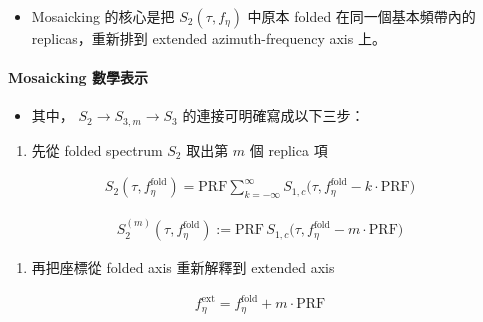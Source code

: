 \documentclass[10pt]{article}
\providecommand{\tightlist}{%
  \setlength{\itemsep}{0pt}\setlength{\parskip}{0pt}}
\begin{document}
\begin{itemize}
\tightlist
\item
  Mosaicking 的核心是把 \(S_2(\tau,f_\eta)\) 中原本 folded
  在同一個基本頻帶內的 replicas，重新排到 extended azimuth-frequency
  axis 上。
\end{itemize}

\hypertarget{mosaicking-ux6578ux5b78ux8868ux793a}{%
\paragraph{Mosaicking
數學表示}\label{mosaicking-ux6578ux5b78ux8868ux793a}}

\begin{itemize}
\tightlist
\item
  其中， \(S_2 \rightarrow S_{3,m} \rightarrow S_3\)
  的連接可明確寫成以下三步：
\end{itemize}

\begin{enumerate}
\def\labelenumi{\arabic{enumi})}
\tightlist
\item
  先從 folded spectrum \(S_2\) 取出第 \(m\) 個 replica 項
\end{enumerate}

\begin{equation}
\begin{aligned}
S_2(\tau,f_\eta^{\mathrm{fold}})
= \mathrm{PRF}\sum_{k=-\infty}^{\infty}S_{1,c}\biggl(\tau,f_\eta^{\mathrm{fold}}-k\cdot\mathrm{PRF}\biggr)
\end{aligned}
\end{equation}

\begin{equation}
\begin{aligned}
S_2^{(m)}(\tau,f_\eta^{\mathrm{fold}})
:= \mathrm{PRF}\,S_{1,c}\biggl(\tau,f_\eta^{\mathrm{fold}}-m\cdot\mathrm{PRF}\biggr)
\end{aligned}
\end{equation}

\begin{enumerate}
\def\labelenumi{\arabic{enumi})}
\setcounter{enumi}{1}
\tightlist
\item
  再把座標從 folded axis 重新解釋到 extended axis
\end{enumerate}

\begin{equation}
\begin{aligned}
f_\eta^{\mathrm{ext}}=f_\eta^{\mathrm{fold}}+m\cdot\mathrm{PRF}
\end{aligned}
\end{equation}
\end{document}
